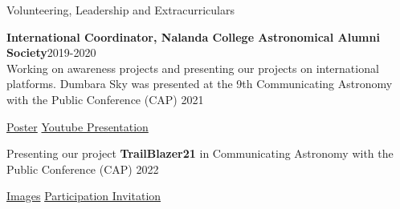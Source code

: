 \documentclass{resume} %
\begin{document}



\begin{rSection}{Volunteering, Leadership and Extracurriculars} 
\vspace{-0.5 cm}
\item \textbf{International Coordinator, Nalanda College Astronomical Alumni Society}\hfill 2019-2020\\
Working on awareness projects and presenting our projects on international platforms. Dumbara Sky was presented at the 9th Communicating Astronomy with the Public Conference (CAP) 2021

\href{https://www.linkedin.com/posts/nalanda-college-astronomy_virtualcap2021-capconference-activity-6806453733996818432-5cLm}
{Poster} \hspace{0.5mm} \href{https://youtu.be/n-3uiRxUGaw}
{Youtube Presentation}

\item Presenting our project  \textbf{TrailBlazer21} in Communicating Astronomy with the Public Conference (CAP) 2022 

\href{https://drive.google.com/drive/folders/1av3B87YsL-kQWWhhfy79hljFgM_03Sr8?usp=share_link}{Images}
 \hspace{0.5mm} 
\href{https://drive.google.com/file/d/1jzb0nsaYMbM1C9SldCbKqJIjGZ62iaJs/view?usp=share_link}{Participation Invitation}

\end{rSection} 
\end{document}

